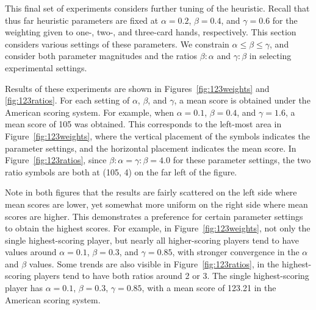 \documentclass[letterpaper]{article}
\begin{document}
This final set of experiments considers further tuning of the heuristic. Recall that thus far heuristic parameters are fixed at $\alpha = 0.2$, $\beta = 0.4$, and $\gamma = 0.6$ for the weighting given to one-, two-, and three-card hands, respectively. This section considers various settings of these parameters. We constrain $\alpha \leq \beta \leq \gamma$, and consider both parameter magnitudes and the ratios $\beta : \alpha$ and $\gamma : \beta$ in selecting experimental settings.


Results of these experiments are shown in Figures~\ref{fig:123weights} and \ref{fig:123ratios}. For each setting of $\alpha$, $\beta$, and $\gamma$, a mean score is obtained under the American scoring system. For example, when $\alpha = 0.1$, $\beta = 0.4$, and $\gamma = 1.6$, a mean score of 105 was obtained. This corresponds to the left-most area in Figure~\ref{fig:123weights}, where the vertical placement of the symbols indicates the parameter settings, and the horizontal placement indicates the mean score. In Figure~\ref{fig:123ratios}, since $\beta:\alpha = \gamma:\beta = 4.0$ for these parameter settings, the two ratio symbols are both at (105, 4) on the far left of the figure.

Note in both figures that the results are fairly scattered on the left side where mean scores are lower, yet somewhat more uniform on the right side where mean scores are higher. This demonstrates a preference for certain parameter settings to obtain the highest scores. For example, in Figure~\ref{fig:123weights}, not only the single highest-scoring player, but nearly all higher-scoring players tend to have values around $\alpha = 0.1$, $\beta = 0.3$, and $\gamma = 0.85$, with stronger convergence in the $\alpha$ and $\beta$ values. Some trends are also visible in Figure~\ref{fig:123ratios}, in the highest-scoring players tend to have both ratios around 2 or 3. The single highest-scoring player has $\alpha = 0.1$, $\beta = 0.3$, $\gamma = 0.85$, with a mean score of 123.21 in the American scoring system.
\end{document}
